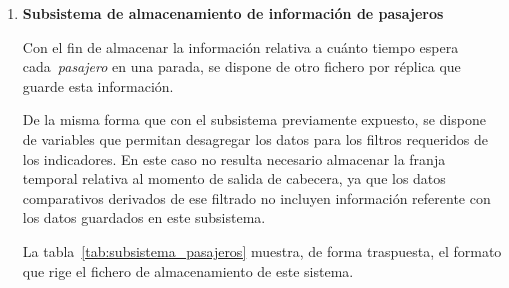 \begin{enumerate}
    Cada fila (representada en la tabla por la columna traspuesta \textbf{Ejemplo}) representa la detención 
    de un agente~\textit{autobús} en una parada a lo largo de todo el proceso de una réplica de la simulación de Monte Carlo.
    
    El añadido de columnas como \texttt{id},~\texttt{travels\_completed},~\texttt{Timeslot} y~\texttt{direction}
    permite el posterior filtrado para desagregaciones específicas, claves para generar los distintos KPIs.

    Nótese que se añade el campo~\texttt{departure\_timeslot} debido a lo expuesto en el capítulo~\ref{chapter:param_analisys}
    en relación con el estudio de viabilidad de datos operacionales. En dicho análisis, la franja horaria asignada a cada registro
    corresponde al momento de la salida de cabecera de la expedición, no al instante de paso por cada parada. Para permitir comparativas
    de \textit{ocupación} coherentes con ese criterio, se incorpora este campo al registro.

    Se guarda la información relativa a las distintas iteraciones (del proceso de Monte Carlo, no de las iteraciones que 
    representan el paso del tiempo en la simulación) en ficheros distintos únicos por cada réplica.
    Una expansión sobre los motivos detrás de esta decisión se expone en la sección siguiente~\ref{subsec:exe_and_sim_one}.
    
    \item \textbf{Subsistema de almacenamiento de información de pasajeros}
        
    Con el fin de almacenar la información relativa a cuánto tiempo espera cada~\textit{pasajero} en una parada, se dispone 
    de otro fichero por réplica que guarde esta información.
    
    De la misma forma que con el subsistema previamente expuesto, se dispone de variables que permitan desagregar los datos 
    para los filtros requeridos de los indicadores. En este caso no resulta necesario almacenar la franja temporal relativa 
    al momento de salida de cabecera, ya que los datos comparativos derivados de ese filtrado no incluyen información referente
    con los datos guardados en este subsistema.

    La tabla~\ref{tab:subsistema_pasajeros} muestra, de forma traspuesta, el formato que rige el fichero de almacenamiento
    de este sistema.
    

\end{enumerate}
